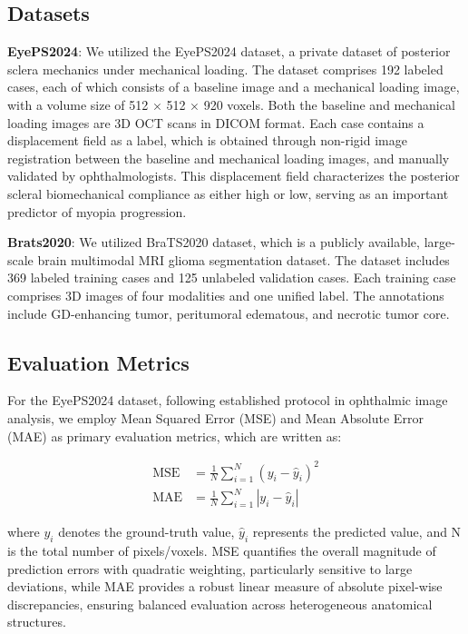 \documentclass[AMA,Times1COL]{WileyNJDv5} %
\begin{document}
\subsection{Datasets}
\textbf{EyePS2024}: We utilized the EyePS2024 dataset, a private dataset of posterior sclera mechanics under mechanical loading. The dataset comprises 192 labeled cases, each of which consists of a baseline image and a mechanical loading image, with a volume size of 512 × 512 × 920 voxels. Both the baseline and mechanical loading images are 3D OCT scans in DICOM format. Each case contains a displacement field as a label, which is obtained through non-rigid image registration between the baseline and mechanical loading images, and manually validated by ophthalmologists. This displacement field characterizes the posterior scleral biomechanical compliance as either high or low, serving as an important predictor of myopia progression.

\textbf{Brats2020}: We utilized BraTS2020 dataset\cite{menze2014multimodal-brats1}\cite{bakas2017advancing-brats2}, which is a publicly available, large-scale brain multimodal MRI glioma segmentation dataset. The dataset includes 369 labeled training cases and 125 unlabeled validation cases. Each training case comprises 3D images of four modalities and one unified label. The annotations include GD-enhancing tumor, peritumoral edematous, and necrotic tumor core.

\subsection{Evaluation Metrics}
For the EyePS2024 dataset, following established protocol in ophthalmic image analysis\cite{oh2024prediction}, we employ Mean Squared Error (MSE) and Mean Absolute Error (MAE) as primary evaluation metrics, which are written as:

\begin{equation}
\begin{aligned}
    \text{MSE} &= \frac{1}{N}\sum_{i=1}^{N}(y_i - \hat{y}_i)^2 \\
    \text{MAE} &= \frac{1}{N}\sum_{i=1}^{N}|y_i - \hat{y}_i|
\end{aligned}
\end{equation}

where $y_i$ denotes the ground-truth value, $\hat{y}_i$ represents the predicted value, and N is the total number of pixels/voxels. MSE quantifies the overall magnitude of prediction errors with quadratic weighting, particularly sensitive to large deviations, while MAE provides a robust linear measure of absolute pixel-wise discrepancies, ensuring balanced evaluation across heterogeneous anatomical structures.
\end{document}
